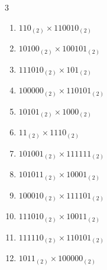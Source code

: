 \begin{multicols}{3}
\begin{enumerate}

\columnbreak %

  \item $110_{(2)} \times 110010_{(2)}$


  \item $10100_{(2)} \times 100101_{(2)}$


  \item $111010_{(2)} \times 101_{(2)}$


  \item $100000_{(2)} \times 110101_{(2)}$


  \item $10101_{(2)} \times 1000_{(2)}$


\columnbreak %

  \item $11_{(2)} \times 1110_{(2)}$


  \item $101001_{(2)} \times 111111_{(2)}$


  \item $101011_{(2)} \times 10001_{(2)}$


  \item $100010_{(2)} \times 111101_{(2)}$


  \item $111010_{(2)} \times 10011_{(2)}$


\columnbreak %

\resetques

  \item $111110_{(2)} \times 110101_{(2)}$


  \item $1011_{(2)} \times 100000_{(2)}$


\end{enumerate}
\end{multicols}
